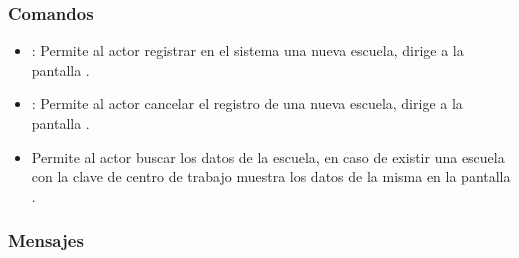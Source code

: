   
  
\subsubsection{Comandos}
    \begin{itemize}
    \item {}: Permite al actor registrar en el sistema una nueva escuela, dirige a la pantalla .
    \item {}: Permite al actor cancelar el registro de una nueva escuela, dirige a la pantalla .
    \item \botBus[Buscar:] Permite al actor buscar los datos de la escuela, en caso de existir una escuela con la clave de centro de trabajo muestra los datos de la misma en la pantalla .
    \end{itemize}

\subsubsection{Mensajes}

